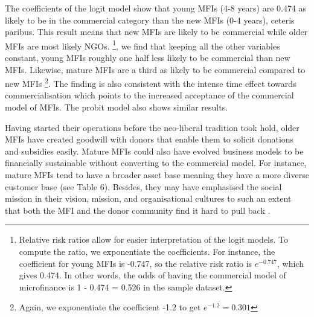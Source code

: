 \documentclass[a4paper,nobind]{templates/ociamthesis}
\begin{document}
The coefficients of the logit model show that young MFIs (4-8 years) are 0.474 as likely to be in the commercial category than the new MFIs (0-4 years), ceteris paribus. This result means that new MFIs are likely to be commercial while older MFIs are most likely NGOs. \footnote{Relative risk ratios allow for easier interpretation of the logit models. To compute the ratio, we exponentiate the coefficients. For instance, the coefficient for young MFIs is -0.747, so the relative risk ratio is \(e^{-0.747}\), which gives 0.474. In other words, the odds of having the commercial model of microfinance is 1 - 0.474 = 0.526 in the sample dataset.}, we find that keeping all the other variables constant, young MFIs roughly one half less likely to be commercial than new MFIs. Likewise, mature MFIs are a third as likely to be commercial compared to new MFIs \footnote{Again, we exponentiate the coefficient -1.2 to get \(e^{-1.2} = 0.301\)}. The finding is also consistent with the intense time effect towards commercialisation which points to the increased acceptance of the commercial model of MFIs. The probit model also shows similar results.

Having started their operations before the neo-liberal tradition took hold, older MFIs have created goodwill with donors that enable them to solicit donations and subsidies easily. Mature MFIs could also have evolved business models to be financially sustainable without converting to the commercial model. For instance, mature MFIs tend to have a broader asset base meaning they have a more diverse customer base (see Table 6). Besides, they may have emphasised the social mission in their vision, mission, and organisational cultures to such an extent that both the MFI and the donor community find it hard to pull back \autocite{ramus2017,berbegal2019impact}.
\end{document}
